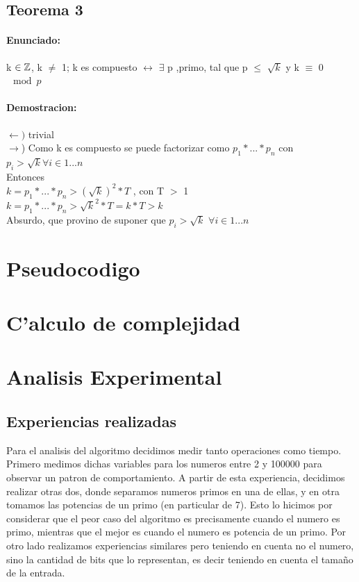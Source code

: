 \subsection{Teorema 3}
\paragraph{Enunciado:}
k ${\in {\mathbb Z}}$, k $\neq$ 1; k es compuesto $\longleftrightarrow$ $\exists$ p ,primo, tal que p $\leq$ $\sqrt{k}$ y k $\equiv$ 0 $\mod{p}$ \\
\paragraph{Demostracion:}
$\leftarrow)$ trivial \\
$\rightarrow$) Como k es compuesto se puede factorizar como $p_1*...*p_n$ con $p_i > \sqrt{k} \forall i \in {1...n}$\\
Entonces \\
$k = p_1*...*p_n > (\sqrt{k})^2* T $ , con T $>$ 1\\  
$k = p_1*...*p_n > \sqrt{k}^2* T = k*T > k$ \\
Absurdo, que provino de suponer que $p_i > \sqrt{k}$ $\forall i \in {1...n}$\\

\section{Pseudocodigo}


\section{C'alculo de complejidad}

\section{Analisis Experimental}
\subsection{Experiencias realizadas}
Para el analisis del algoritmo decidimos medir tanto operaciones como tiempo. Primero medimos dichas variables para los numeros entre 2 y 100000 para observar un patron de comportamiento. A partir de esta experiencia, decidimos realizar otras dos, donde separamos numeros primos en una de ellas, y en otra tomamos las potencias de un primo (en particular de 7). Esto lo hicimos por considerar que el peor caso del algoritmo es precisamente cuando el numero es primo, mientras que el mejor es cuando el numero es potencia de un primo. Por otro lado realizamos experiencias similares pero teniendo en cuenta no el numero, sino la cantidad de bits que lo representan, es decir teniendo en cuenta el tama\~{n}o de la entrada.

